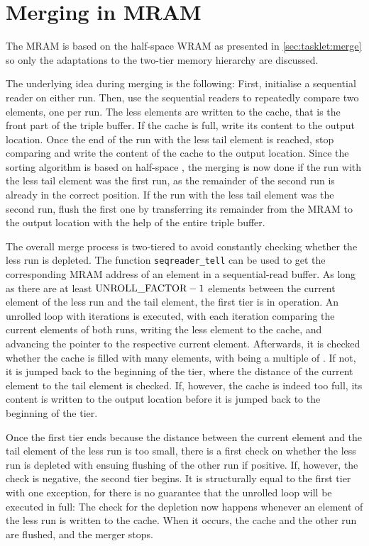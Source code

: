 \section{Merging in MRAM}
\label{sec:mram:merge}

The MRAM \MS{} is based on the half-space WRAM \MS{} as presented in \cref{sec:tasklet:merge} so only the adaptations to the two-tier memory hierarchy are discussed.

The underlying idea during merging is the following:
First, initialise a sequential reader on either run.
Then, use the sequential readers to repeatedly compare two elements, one per run.
The less elements are written to the cache, that is the front part of the triple buffer.
If the cache is full, write its content to the output location.
Once the end of the run with the less tail element is reached, stop comparing and write the content of the cache to the output location.
Since the sorting algorithm is based on half-space \MS{}, the merging is now done if the run with the less tail element was the first run, as the remainder of the second run is already in the correct position.
If the run with the less tail element was the second run, flush the first one by transferring its remainder from the MRAM to the output location with the help of the entire triple buffer.

The overall merge process is two-tiered to avoid constantly checking whether the less run is depleted.
The function \lstinline|seqreader_tell| can be used to get the corresponding MRAM address of an element in a sequential-read buffer.
As long as there are at least \(\unrollfactor{} - 1\) elements between the current element of the less run and the tail element, the first tier is in operation.
An unrolled loop with \unrollfactor{} iterations is executed, with each iteration comparing the current elements of both runs, writing the less element to the cache, and advancing the pointer to the respective current element.
Afterwards, it is checked whether the cache is filled with \unrolledcachelength{} many elements, with \unrolledcachelength{} being a multiple of \unrollfactor{}.
If not, it is jumped back to the beginning of the tier, where the distance of the current element to the tail element is checked.
If, however, the cache is indeed too full, its content is written to the output location before it is jumped back to the beginning of the tier.

Once the first tier ends because the distance between the current element and the tail element of the less run is too small, there is a first check on whether the less run is depleted with ensuing flushing of the other run if positive.
If, however, the check is negative, the second tier begins.
It is structurally equal to the first tier with one exception, for there is no guarantee that the unrolled loop will be executed in full:
The check for the depletion now happens whenever an element of the less run is written to the cache.
When it occurs, the cache and the other run are flushed, and the merger stops.

\begin{algorithm}
	\KwIn{%

	}
	\KwOut{%

	}


	\caption{
	}
	\label{alg}
\end{algorithm}
